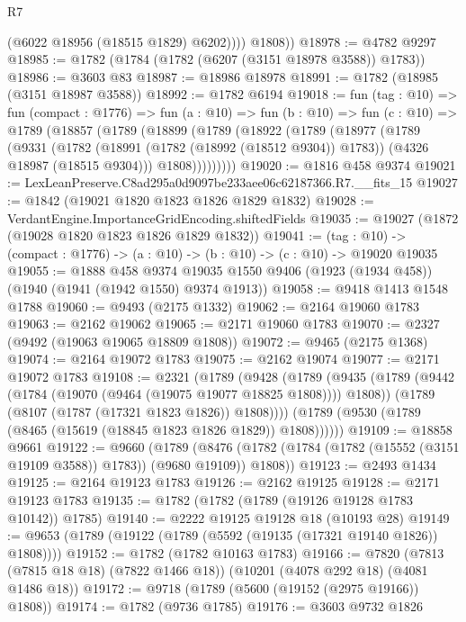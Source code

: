 \begin{lexlean}{R7}
\begin{coremodule}
              (@6022 @18956 (@18515 @1829) @6202))))
        @1808))
@18978 := @4782 @9297
@18985 := @1782 (@1784 (@1782 (@6207 (@3151 @18978 @3588)) @1783))
@18986 := @3603 @83
@18987 := @18986 @18978
@18991 := @1782 (@18985 (@3151 @18987 @3588))
@18992 := @1782 @6194
@19018 := fun (tag : @10) =>
  fun (compact : @1776) =>
  fun (a : @10) =>
  fun (b : @10) =>
  fun (c : @10) =>
  @1789
    (@18857
      (@1789
        (@18899
          (@1789
            (@18922
              (@1789
                (@18977
                  (@1789
                    (@9331
                      (@1782
                        (@18991 (@1782 (@18992 (@18512 @9304)) @1783))
                        (@4326 @18987 (@18515 @9304)))
                      @1808)))))))))
@19020 := @1816 @458 @9374
@19021 := LexLeanPreserve.C8ad295a0d9097be233aee06c62187366.R7.__fits_15
@19027 := @1842 (@19021 @1820 @1823 @1826 @1829 @1832)
@19028 := VerdantEngine.ImportanceGridEncoding.shiftedFields
@19035 := @19027 (@1872 (@19028 @1820 @1823 @1826 @1829 @1832))
@19041 := (tag : @10) -> (compact : @1776) -> (a : @10) -> (b : @10) -> (c : @10) -> @19020 @19035
@19055 := @1888
    @458
    @9374
    @19035
    @1550
    @9406
    (@1923 (@1934 @458))
    (@1940 (@1941 (@1942 @1550) @9374 @1913))
@19058 := @9418 @1413 @1548 @1788
@19060 := @9493 (@2175 @1332)
@19062 := @2164 @19060 @1783
@19063 := @2162 @19062
@19065 := @2171 @19060 @1783
@19070 := @2327 (@9492 (@19063 @19065 @18809 @1808))
@19072 := @9465 (@2175 @1368)
@19074 := @2164 @19072 @1783
@19075 := @2162 @19074
@19077 := @2171 @19072 @1783
@19108 := @2321
    (@1789
      (@9428
        (@1789
          (@9435
            (@1789 (@9442 (@1784 (@19070 (@9464 (@19075 @19077 @18825 @1808)))) @1808))
            (@1789 (@8107 (@1787 (@17321 @1823 @1826)) @1808))))
        (@1789 (@9530 (@1789 (@8465 (@15619 (@18845 @1823 @1826 @1829)) @1808))))))
@19109 := @18858 @9661
@19122 := @9660
    (@1789 (@8476 (@1782 (@1784 (@1782 (@15552 (@3151 @19109 @3588)) @1783)) (@9680 @19109)) @1808))
@19123 := @2493 @1434
@19125 := @2164 @19123 @1783
@19126 := @2162 @19125
@19128 := @2171 @19123 @1783
@19135 := @1782 (@1782 (@1789 (@19126 @19128 @1783 @10142)) @1785)
@19140 := @2222 @19125 @19128 @18 (@10193 @28)
@19149 := @9653 (@1789 (@19122 (@1789 (@5592 (@19135 (@17321 @19140 @1826)) @1808))))
@19152 := @1782 (@1782 @10163 @1783)
@19166 := @7820
    (@7813 (@7815 @18 @18) (@7822 @1466 @18))
    (@10201 (@4078 @292 @18) (@4081 @1486 @18))
@19172 := @9718 (@1789 (@5600 (@19152 (@2975 @19166)) @1808))
@19174 := @1782 (@9736 @1785)
@19176 := @3603 @9732 @1826

\end{coremodule}
\end{lexlean}
